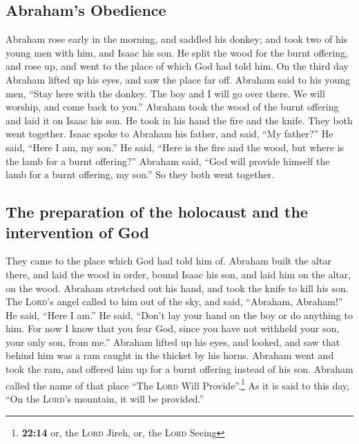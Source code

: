 \hypertarget{abrahams-obedience}{%
\subsection{Abraham's Obedience}\label{abrahams-obedience}}

 Abraham rose early in the morning, and saddled his
donkey; and took two of his young men with him, and Isaac his son. He
split the wood for the burnt offering, and rose up, and went to the
place of which God had told him.  On the third day Abraham
lifted up his eyes, and saw the place far off.  Abraham
said to his young men, ``Stay here with the donkey. The boy and I will
go over there. We will worship, and come back to you.'' 
Abraham took the wood of the burnt offering and laid it on Isaac his
son. He took in his hand the fire and the knife. They both went
together.  Isaac spoke to Abraham his father, and said,
``My father?'' He said, ``Here I am, my son.'' He said, ``Here is the
fire and the wood, but where is the lamb for a burnt offering?''
 Abraham said, ``God will provide himself the lamb for a
burnt offering, my son.'' So they both went together.

\hypertarget{the-preparation-of-the-holocaust-and-the-intervention-of-god}{%
\subsection{The preparation of the holocaust and the intervention of
God}\label{the-preparation-of-the-holocaust-and-the-intervention-of-god}}

 They came to the place which God had told him of. Abraham
built the altar there, and laid the wood in order, bound Isaac his son,
and laid him on the altar, on the wood.  Abraham
stretched out his hand, and took the knife to kill his son.
 The \textsc{Lord}'s angel called to him out of the sky,
and said, ``Abraham, Abraham!'' He said, ``Here I am.'' 
He said, ``Don't lay your hand on the boy or do anything to him. For now
I know that you fear God, since you have not withheld your son, your
only son, from me.''  Abraham lifted up his eyes, and
looked, and saw that behind him was a ram caught in the thicket by his
horns. Abraham went and took the ram, and offered him up for a burnt
offering instead of his son.  Abraham called the name of
that place ``The \textsc{Lord} Will Provide''.\footnote{\textbf{22:14}
  or, the \textsc{Lord} Jireh, or, the \textsc{Lord} Seeing} As it is
said to this day, ``On the \textsc{Lord}'s mountain, it will be
provided.''

